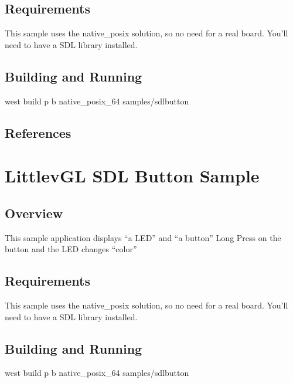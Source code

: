 \documentclass[letterpaper,10pt,english]{sphinxmanual}
\begin{document}
\subsection{Requirements}
\label{\detokenize{samples/samplespinebuttonREADME:requirements}}
This sample uses the native\_posix solution, so no need for a real board.
You’ll need to have a SDL library installed.


\subsection{Building and Running}
\label{\detokenize{samples/samplespinebuttonREADME:building-and-running}}
west build \sphinxhyphen{}p \sphinxhyphen{}b native\_posix\_64 samples/sdlbutton


\subsection{References}
\label{\detokenize{samples/samplespinebuttonREADME:references}}

\section{LittlevGL SDL Button  Sample}
\label{\detokenize{samples/samplessdlbuttonREADME:littlevgl-sdl-button-sample}}\label{\detokenize{samples/samplessdlbuttonREADME:sdl-sample}}\label{\detokenize{samples/samplessdlbuttonREADME::doc}}

\subsection{Overview}
\label{\detokenize{samples/samplessdlbuttonREADME:overview}}
This sample application displays “a LED” and “a button”
Long Press on the button and the LED changes “color”


\subsection{Requirements}
\label{\detokenize{samples/samplessdlbuttonREADME:requirements}}
This sample uses the native\_posix solution, so no need for a real board.
You’ll need to have a SDL library installed.


\subsection{Building and Running}
\label{\detokenize{samples/samplessdlbuttonREADME:building-and-running}}
west build \sphinxhyphen{}p \sphinxhyphen{}b native\_posix\_64 samples/sdlbutton
\end{document}
